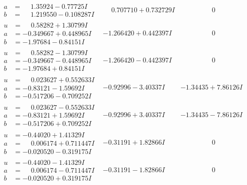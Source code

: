 \documentclass[1p]{elsarticle_modified}
\theoremstyle{definition}
\begin{document}
$$\begin{array}{c|c|c}
\begin{aligned}
a &= \phantom{-}1.35924 - 0.77725 I \\
b &= \phantom{-}1.219550 - 0.108287 I\end{aligned}
 & \phantom{-}0.707710 + 0.732729 I & \phantom{-0.000000 } 0 \\ \hline\begin{aligned}
u &= \phantom{-}0.58282 + 1.30799 I \\
a &= -0.349667 + 0.448965 I \\
b &= -1.97684 - 0.84151 I\end{aligned}
 & -1.266420 + 0.442397 I & \phantom{-0.000000 } 0 \\ \hline\begin{aligned}
u &= \phantom{-}0.58282 - 1.30799 I \\
a &= -0.349667 - 0.448965 I \\
b &= -1.97684 + 0.84151 I\end{aligned}
 & -1.266420 - 0.442397 I & \phantom{-0.000000 } 0 \\ \hline\begin{aligned}
u &= \phantom{-}0.023627 + 0.552633 I \\
a &= -0.83121 - 1.59692 I \\
b &= -0.517206 - 0.709252 I\end{aligned}
 & -0.92996 - 3.40337 I & -1.34435 + 7.86126 I \\ \hline\begin{aligned}
u &= \phantom{-}0.023627 - 0.552633 I \\
a &= -0.83121 + 1.59692 I \\
b &= -0.517206 + 0.709252 I\end{aligned}
 & -0.92996 + 3.40337 I & -1.34435 - 7.86126 I \\ \hline\begin{aligned}
u &= -0.44020 + 1.41329 I \\
a &= \phantom{-}0.006174 + 0.711447 I \\
b &= -0.020520 - 0.319175 I\end{aligned}
 & -0.31191 + 1.82866 I & \phantom{-0.000000 } 0 \\ \hline\begin{aligned}
u &= -0.44020 - 1.41329 I \\
a &= \phantom{-}0.006174 - 0.711447 I \\
b &= -0.020520 + 0.319175 I\end{aligned}
 & -0.31191 - 1.82866 I & \phantom{-0.000000 } 0 \\ \hline\begin{aligned}

\end{aligned}
\end{array}$$
\end{document}
